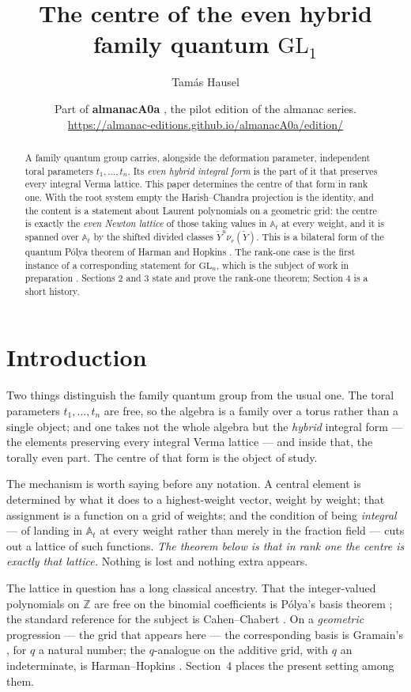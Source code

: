 \documentclass[11pt]{article}
\title{\textbf{The centre of the even hybrid family quantum $\mathrm{GL}_1$}}
\author{Tam\'as Hausel}
\date{\normalsize Part of \textbf{almanacA0a} \cite{almanacA0a}, the pilot edition of the
almanac series.\\[2pt]
\small\url{https://almanac-editions.github.io/almanacA0a/edition/}}
\newcommand{\At}{\mathbb{A}_t}
\newcommand{\Yc}{\check Y}
\begin{document}
\maketitle



\begin{abstract}\noindent
A family quantum group carries, alongside the deformation parameter, independent toral parameters
$t_1,\dots,t_n$. Its \emph{even hybrid integral form} is the part of it that preserves every
integral Verma lattice. This paper determines the centre of that form in rank one. With the root
system empty the Harish--Chandra projection is the identity, and the content is a statement about
Laurent polynomials on a geometric grid: the centre is exactly the \emph{even Newton lattice} of
those taking values in $\At$ at every weight, and it is spanned over $\At$ by the shifted divided
classes $\Yc^{u}\nu_r(\Yc)$. This is a bilateral form of the quantum P\'olya theorem of Harman and
Hopkins \cite{HarmanHopkins}. The rank-one case is the first instance of a corresponding statement
for $\mathrm{GL}_n$, which is the subject of work in preparation \cite{HauselLowit}. Sections 2 and 3 state
and prove the rank-one theorem; Section 4 is a short history.
\end{abstract}

\section{Introduction}

\noindent
Two things distinguish the family quantum group from the usual one. The toral parameters
$t_1,\dots,t_n$ are free, so the algebra is a family over a torus rather than a single object; and
one takes not the whole algebra but the \emph{hybrid} integral form --- the elements preserving
every integral Verma lattice --- and inside that, the torally even part. The centre of that form is
the object of study.

\medskip\noindent
The mechanism is worth saying before any notation. A central element is determined by what it does
to a highest-weight vector, weight by weight; that assignment is a function on a grid of weights;
and the condition of being \emph{integral} --- of landing in $\At$ at every weight rather than
merely in the fraction field --- cuts out a lattice of such functions. \emph{The theorem below is
that in rank one the centre is exactly that lattice.} Nothing is lost and nothing extra appears.

\medskip\noindent
The lattice in question has a long classical ancestry. That the integer-valued polynomials on
$\mathbb Z$ are free on the binomial coefficients is P\'olya's basis theorem
\cite[Prop.~1.1]{HarmanHopkins}; the standard reference for the subject is Cahen--Chabert
\cite{CahenChabert}. On a \emph{geometric} progression --- the grid that appears here --- the
corresponding basis is Gramain's \cite[Prop.~2.2]{Gramain}, for $q$ a natural number; the
$q$-analogue on the additive grid, with $q$ an indeterminate, is Harman--Hopkins
\cite{HarmanHopkins}. Section~4 places the present setting among them.
\end{document}
